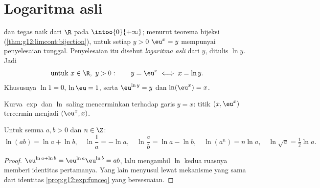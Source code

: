 \section{Logaritma asli}

\begin{definition}\label{def:g12:exp:ln}
  dan tegas naik dari $\R$ pada
$\intoo{0}{+\infty}$; menurut teorema bijeksi
(\cref{thm:g12:limcont:bijection}), untuk setiap $y > 0$ 
$\eu^x = y$ mempunyai penyelesaian tunggal. Penyelesaian itu disebut
\emph{logaritma asli} dari $y$, ditulis $\ln y$. Jadi
\[
\text{untuk } x \in \R,\ y > 0: \qquad y = \eu^x \iff x = \ln y .
\]
Khususnya $\ln 1 = 0$, $\ln \eu = 1$, serta
$\eu^{\ln y} = y$ dan $\ln(\eu^x) = x$.
\end{definition}

\begin{omfigure}

{\small Kurva $\exp$ dan $\ln$ saling mencerminkan
terhadap garis $y = x$: titik $(x, \eu^x)$ tercermin menjadi $(\eu^x, x)$.}
\end{omfigure}

\begin{proposition}\label{prop:g12:exp:lnalg}
Untuk semua $a, b > 0$ dan $n \in \Z$:
\[
\ln(ab) = \ln a + \ln b, \quad
\ln\frac{1}{a} = -\ln a, \quad
\ln\frac{a}{b} = \ln a - \ln b, \quad
\ln(a^n) = n \ln a, \quad
\ln\sqrt{a} = \tfrac12 \ln a .
\]
\end{proposition}

\begin{proof}
$\eu^{\ln a + \ln b} = \eu^{\ln a}\eu^{\ln b} = ab$, lalu mengambil $\ln$
kedua ruasnya memberi identitas pertamanya. Yang lain menyusul lewat mekanisme
yang sama dari identitas \cref{prop:g12:exp:funceq} yang bersesuaian.
\end{proof}

